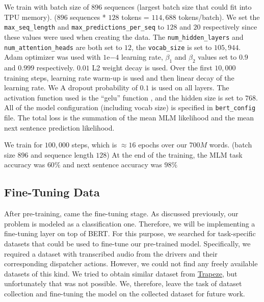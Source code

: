 We train with batch size of $896$ sequences (largest batch size that could fit into \ac{TPU} memory). ($896$ sequences * $128$ tokens = $114,688$ tokens/batch). We set the \texttt{max\_seq\_length} and \texttt{max\_predictions\_per\_seq} to $128$ and $20$ respectively since these values were used when creating the data. The \texttt{num\_hidden\_layers} and \texttt{num\_attention\_heads} are both set to $12$, the \texttt{vocab\_size} is set to $105,944$. Adam optimizer \cite{kingma2014adam} was used with $1\mathrm{e}{-4}$ learning rate, $\beta_1$ and $\beta_2$ values set to $0.9$ and $0.999$ respectively. $0.01$ L2 weight decay is used. Over the first $10,000$ training steps, learning rate warm-up is used and then linear decay of the learning rate.  We A dropout probability of $0.1$ is used on all layers. The activation function used is the \enquote{gelu} function \cite{hendrycks2016bridging}, and the hidden size is set to $768$. All of the model configuration (including vocab size) is specified in \texttt{bert\_config} file. The total loss is the summation of the mean \ac{MLM} likelihood and the mean next sentence prediction likelihood.


We train for $100,000$ steps, which is $\approx 16$ epochs over our $700M$ words. (batch size $896$ and sequence length $128$) At the end of the training, the \ac{MLM} task accuracy was $60\%$ and next sentence accuracy was $98\%$ 


 

\subsection{Fine-Tuning Data}
After pre-training, came the fine-tuning stage. As discussed previously, our problem is modeled as a classification one. Therefore, we will be implementing a fine-tuning layer on top of \ac{BERT}. For this purpose, we searched for task-specific datasets that could be used to fine-tune our pre-trained model. Specifically, we required a dataset with transcribed audio from the drivers and their corresponding dispatcher actions. However, we could not find any freely available datasets of this kind. We tried to obtain similar dataset from \href{https://www.trapezegroup.eu/}{Trapeze}, but unfortunately that was not possible. We, therefore, leave the task of dataset collection and fine-tuning the model on the collected dataset for future work. 

